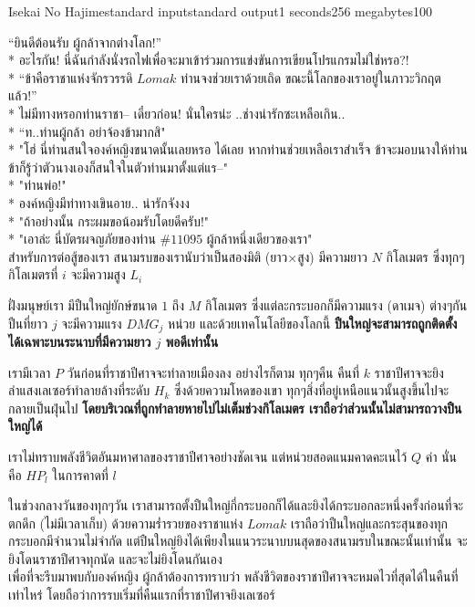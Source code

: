 \documentclass[11pt,a4paper]{article}
\begin{document}
\begin{problem}{Isekai No Hajime}{standard input}{standard output}{1 seconds}{256 megabytes}{100}

“ยินดีต้อนรับ ผู้กล้าจากต่างโลก!”\\*
อะไรกัน! นี่ฉันกำลังนั่งรถไฟเพื่อจะมาเข้าร่วมการแข่งขันการเขียนโปรแกรมไม่ใช่หรอ?!\\*
“ข้าคือราชาแห่งจักรวรรดิ $Lomak$ ท่านจงช่วยเราด้วยเถิด ขณะนี้โลกของเราอยู่ในภาวะวิกฤตแล้ว!”\\*
ไม่มีทางหรอกท่านราชา-- เดี๋ยวก่อน! นั่นใครน่ะ ..ช่างน่ารักซะเหลือเกิน..\\*
“ท..ท่านผู้กล้า อย่าจ้องข้ามากสิ"\\*
"โฮ่ นี่ท่านสนใจองค์หญิงขนาดนั้นเลยหรอ ได้เลย หากท่านช่วยเหลือเราสำเร็จ ข้าจะมอบนางให้ท่าน ข้าก็รู้ว่าตัวนางเองก็สนใจในตัวท่านมาตั้งแต่แร--"\\*
"ท่านพ่อ!"\\*
องค์หญิงมีท่าทางเขินอาย.. น่ารักจังงง\\*
"ถ้าอย่างนั้น กระผมขอน้อมรับโดยดีครับ!"\\*
"เอาล่ะ นี่บัตรผจญภัยของท่าน $\#11095$ ผู้กล้าหนึ่งเดียวของเรา"\\

สำหรับการต่อสู้ของเรา สนามรบของเรานับว่าเป็นสองมิติ (ยาว×สูง) มีความยาว $N$ กิโลเมตร ซึ่งทุกๆกิโลเมตรที่ $i$ จะมีความสูง $L_i$\par
ฝั่งมนุษย์เรา มีปืนใหญ่ยักษ์ขนาด $1$ ถึง $M$ กิโลเมตร ซึ่งแต่ละกระบอกก็มีความแรง (ดาเมจ) ต่างๆกัน ปืนที่ยาว $j$ จะมีความแรง $DMG_j$ หน่วย และด้วยเทคโนโลยีของโลกนี้ \textbf{ปืนใหญ่จะสามารถถูกติดตั้งได้เฉพาะบนระนาบที่มีความยาว $j$ พอดีเท่านั้น} \par
เรามีเวลา $P$ วันก่อนที่ราชาปีศาจจะทำลายเมืองลง อย่างไรก็ตาม ทุกๆคืน คืนที่ $k$ ราชาปีศาจจะยิงลำแสงเลเซอร์ทำลายล้างที่ระดับ $H_k$ ซึ่งด้วยความโหดของเขา ทุกๆสิ่งที่อยู่เหนือแนวนั้นสูงขึ้นไปจะกลายเป็นฝุ่นไป \textbf{โดยบริเวณที่ถูกทำลายหายไปไม่เต็มช่วงกิโลเมตร เราถือว่าส่วนนั้นไม่สามารถวางปืนใหญ่ได้}\par
เราไม่ทราบพลังชีวิตอันมหาศาลของราชาปีศาจอย่างชัดเจน แต่หน่วยสอดแนมคาดคะเนไว้ $Q$ ค่า นั่นคือ $HP_l$ ในการคาดที่ $l$\par
ในช่วงกลางวันของทุกๆวัน เราสามารถตั้งปืนใหญ่กี่กระบอกก็ได้และยิงได้กระบอกละหนึ่งครั้งก่อนที่จะตกดึก (ไม่มีเวลาเก็บ) ด้วยความร่ำรวยของราชาแห่ง $Lomak$ เราถือว่าปืนใหญ่และกระสุนของทุกกระบอกมีจำนวนไม่จำกัด แต่ปืนใหญ่ยิงได้เพียงในแนวระนาบบนสุดของสนามรบในขณะนั้นเท่านั้น จะยิงโดนราชาปีศาจทุกนัด และจะไม่ยิงโดนกันเอง \\
เพื่อที่จะรีบมาพบกับองค์หญิง ผู้กล้าต้องการทราบว่า พลังชีวิตของราชาปีศาจจะหมดไวที่สุดได้ในคืนที่เท่าไหร่ โดยถือว่าการรบเริ่มที่คืนแรกที่ราชาปีศาจยิงเลเซอร์


\end{problem}
\end{document}
